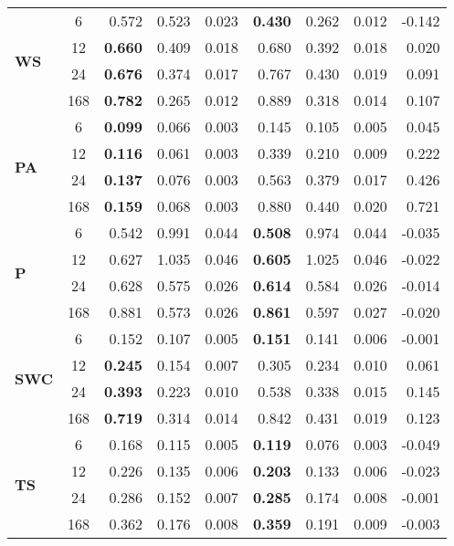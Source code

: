 \begin{table}
\begin{tabular}{p{2.1cm}c|rrr|rrr|r}
\multirow[c]{4}{*}{\parbox{2.1cm}{\textbf{WS}}} & 6 & 0.572 & 0.523 & 0.023 & \bfseries 0.430 & 0.262 & 0.012 & -0.142 \\
 & 12 & \bfseries 0.660 & 0.409 & 0.018 & 0.680 & 0.392 & 0.018 & 0.020 \\
 & 24 & \bfseries 0.676 & 0.374 & 0.017 & 0.767 & 0.430 & 0.019 & 0.091 \\
 & 168 & \bfseries 0.782 & 0.265 & 0.012 & 0.889 & 0.318 & 0.014 & 0.107 \\
\cline{1-9}
\multirow[c]{4}{*}{\parbox{2.1cm}{\textbf{PA}}} & 6 & \bfseries 0.099 & 0.066 & 0.003 & 0.145 & 0.105 & 0.005 & 0.045 \\
 & 12 & \bfseries 0.116 & 0.061 & 0.003 & 0.339 & 0.210 & 0.009 & 0.222 \\
 & 24 & \bfseries 0.137 & 0.076 & 0.003 & 0.563 & 0.379 & 0.017 & 0.426 \\
 & 168 & \bfseries 0.159 & 0.068 & 0.003 & 0.880 & 0.440 & 0.020 & 0.721 \\
\cline{1-9}
\multirow[c]{4}{*}{\parbox{2.1cm}{\textbf{P}}} & 6 & 0.542 & 0.991 & 0.044 & \bfseries 0.508 & 0.974 & 0.044 & -0.035 \\
 & 12 & 0.627 & 1.035 & 0.046 & \bfseries 0.605 & 1.025 & 0.046 & -0.022 \\
 & 24 & 0.628 & 0.575 & 0.026 & \bfseries 0.614 & 0.584 & 0.026 & -0.014 \\
 & 168 & 0.881 & 0.573 & 0.026 & \bfseries 0.861 & 0.597 & 0.027 & -0.020 \\
\cline{1-9}
\multirow[c]{4}{*}{\parbox{2.1cm}{\textbf{SWC}}} & 6 & 0.152 & 0.107 & 0.005 & \bfseries 0.151 & 0.141 & 0.006 & -0.001 \\
 & 12 & \bfseries 0.245 & 0.154 & 0.007 & 0.305 & 0.234 & 0.010 & 0.061 \\
 & 24 & \bfseries 0.393 & 0.223 & 0.010 & 0.538 & 0.338 & 0.015 & 0.145 \\
 & 168 & \bfseries 0.719 & 0.314 & 0.014 & 0.842 & 0.431 & 0.019 & 0.123 \\
\cline{1-9}
\multirow[c]{4}{*}{\parbox{2.1cm}{\textbf{TS}}} & 6 & 0.168 & 0.115 & 0.005 & \bfseries 0.119 & 0.076 & 0.003 & -0.049 \\
 & 12 & 0.226 & 0.135 & 0.006 & \bfseries 0.203 & 0.133 & 0.006 & -0.023 \\
 & 24 & 0.286 & 0.152 & 0.007 & \bfseries 0.285 & 0.174 & 0.008 & -0.001 \\
 & 168 & 0.362 & 0.176 & 0.008 & \bfseries 0.359 & 0.191 & 0.009 & -0.003 \\
\cline{1-9}
\bottomrule
\end{tabular}
\end{table}
